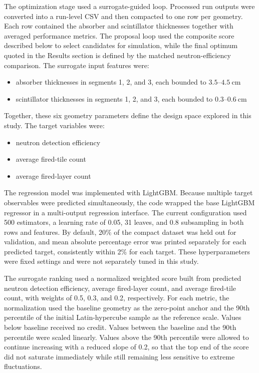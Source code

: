 \noindent The optimization stage used a surrogate-guided loop. Processed run outputs were converted into a run-level CSV and then compacted to one row per geometry. Each row
contained the absorber and scintillator thicknesses together with averaged performance metrics. The proposal loop used the composite score described below to select candidates for simulation, while the final optimum quoted in the Results section is defined by the matched neutron-efficiency comparison. The surrogate input features were:
\begin{itemize}[nosep]
    \item absorber thicknesses in segments 1, 2, and 3, each bounded to $3.5$--$4.5~\mathrm{cm}$
    \item scintillator thicknesses in segments 1, 2, and 3, each bounded to $0.3$--$0.6~\mathrm{cm}$
\end{itemize}
Together, these six geometry parameters define the design space explored in this study. The target variables were:
\begin{itemize}[nosep]
    \item neutron detection efficiency
    \item average fired-tile count
    \item average fired-layer count
\end{itemize}

\noindent The regression model was implemented with LightGBM\cite{Ke:2017lightgbm}. Because multiple target observables were predicted simultaneously, the code wrapped the base LightGBM regressor in a
multi-output regression interface. The current configuration used 500 estimators, a learning rate of 0.05, 31 leaves, and 0.8 subsampling in both rows and features. By default,
20\% of the compact dataset was held out for validation, and mean absolute percentage error was printed separately for each predicted target, consistently within 2\% for each target. These
hyperparameters were fixed settings and were not separately tuned in this study.

\noindent The surrogate ranking used a normalized weighted score built from predicted neutron detection efficiency, average fired-layer count, and average fired-tile count, with weights of
0.5, 0.3, and 0.2, respectively. For each metric, the normalization used the baseline geometry as the zero-point anchor and the 90th percentile of the initial Latin-hypercube sample
as the reference scale. Values below baseline received no credit. Values between the baseline and the 90th percentile were scaled linearly. Values above the 90th percentile were allowed
to continue increasing with a reduced slope of 0.2, so that the top end of the score did not saturate immediately while still remaining less sensitive to extreme fluctuations.

